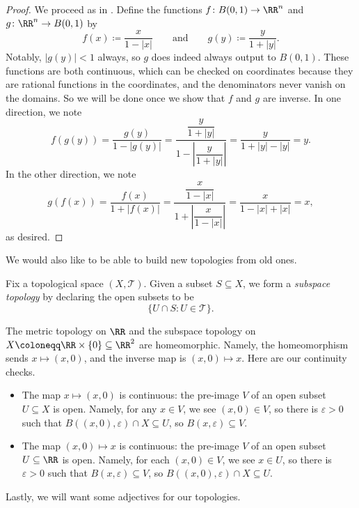 \documentclass[../notes.tex]{subfiles}
\begin{document}
\begin{proof}
	We proceed as in \cite{ms1072818}. Define the functions $f\colon B(0,1)\to\RR^n$ and $g\colon\RR^n\to B(0,1)$ by
	\[f(x)\coloneqq\frac{x}{1-\left|x\right|}\qquad\text{and}\qquad g(y)\coloneqq\frac{y}{1+\left|y\right|}.\]
	Notably, $\left|g(y)\right|<1$ always, so $g$ does indeed always output to $B(0,1)$. These functions are both continuous, which can be checked on coordinates because they are rational functions in the coordinates, and the denominators never vanish on the domains. So we will be done once we show that $f$ and $g$ are inverse. In one direction, we note
	\[f(g(y)) = \frac{g(y)}{1-\left|g(y)\right|} = \dfrac{\dfrac y{1+\left|y\right|}}{1-\left|\dfrac y{1+\left|y\right|}\right|} = \frac{y}{1+\left|y\right|-\left|y\right|}=y.\]
	In the other direction, we note
	\[g(f(x)) = \frac{f(x)}{1+\left|f(x)\right|} = \dfrac{\dfrac x{1-\left|x\right|}}{1+\left|\dfrac x{1-\left|x\right|}\right|} = \frac x{1-\left|x\right|+\left|x\right|}=x,\]
	as desired.
\end{proof}
We would also like to be able to build new topologies from old ones.
\begin{definition}[subspace]
	Fix a topological space $(X,\mathcal T)$. Given a subset $S\subseteq X$, we form a \textit{subspace topology} by declaring the open subsets to be
	\[\{U\cap S:U\in\mathcal T\}.\]
\end{definition}
\begin{example} \label{ex:basic-homeo}
	The metric topology on $\RR$ and the subspace topology on $X\coloneqq\RR\times\{0\}\subseteq\RR^2$ are homeomorphic. Namely, the homeomorphism sends $x\mapsto(x,0)$, and the inverse map is $(x,0)\mapsto x$. Here are our continuity checks.
	\begin{itemize}
		\item The map $x\mapsto(x,0)$ is continuous: the pre-image $V$ of an open subset $U\subseteq X$ is open. Namely, for any $x\in V$, we see $(x,0)\in V$, so there is $\varepsilon>0$ such that $B((x,0),\varepsilon)\cap X\subseteq U$, so $B(x,\varepsilon)\subseteq V$.
		\item The map $(x,0)\mapsto x$ is continuous: the pre-image $V$ of an open subset $U\subseteq\RR$ is open. Namely, for each $(x,0)\in V$, we see $x\in U$, so there is $\varepsilon>0$ such that $B(x,\varepsilon)\subseteq V$, so $B((x,0),\varepsilon)\cap X\subseteq U$.
	\end{itemize}
\end{example}
Lastly, we will want some adjectives for our topologies.
\end{document}
